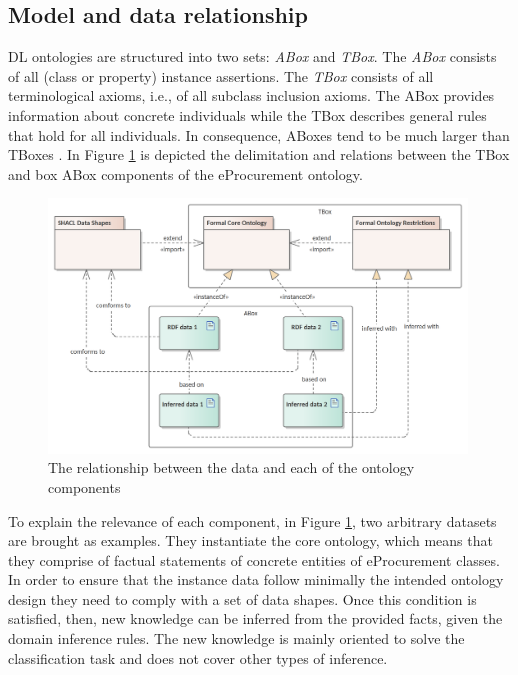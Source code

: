 	\subsection{Model and data relationship}
	\label{sec:model-data}
	
	DL ontologies are structured into two sets: \textit{ABox} and \textit{TBox}. The \textit{ABox} consists of all (class or property) instance assertions. The \textit{TBox }consists of all terminological axioms, i.e., of all subclass inclusion axioms. The ABox provides information about concrete individuals while the TBox describes general rules that hold for all individuals. In consequence, ABoxes tend to be much larger than TBoxes \citep{krotzsch2012owl}. In Figure \ref{fig:abox-tbox} is depicted the delimitation and relations between the TBox and box ABox components of the eProcurement ontology.
	
	\begin{figure}[!ht]
		\centering
		\includegraphics[width=0.99\textwidth]{../img/ontology.png}
		\caption{The relationship between the data and each of the ontology components}
		\label{fig:abox-tbox}
	\end{figure}
	
	To explain the relevance of each component, in Figure \ref{fig:abox-tbox}, two arbitrary datasets are brought as examples. They instantiate the core ontology, which means that they comprise of factual statements of concrete entities of eProcurement classes. In order to ensure that the instance data follow minimally the intended ontology design they need to comply with a set of data shapes. Once this condition is satisfied, then, new knowledge can be inferred from the provided facts, given the domain inference rules. The new knowledge is mainly oriented to solve the classification task and does not cover other types of inference. 	
	
